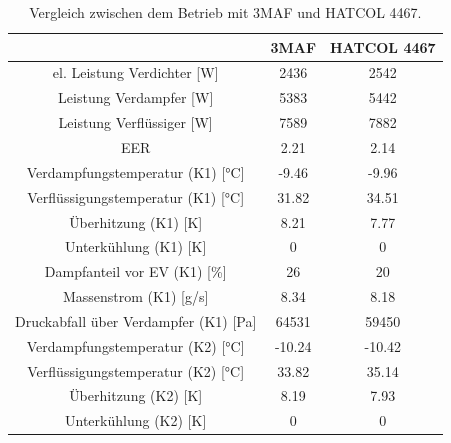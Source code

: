 \begin{table}[h!]
\centering
\caption{Vergleich zwischen dem Betrieb mit 3MAF und HATCOL 4467.}
\label{tab:VergleichKMOele}
\begin{tabular}{|ccc|}
\hline

                                                                & 3MAF                        & HATCOL 4467 \\ \hline
\multicolumn{1}{|c|}{el. Leistung Verdichter {[}W{]}}           & \multicolumn{1}{c|}{2436}   & 2542        \\
\multicolumn{1}{|c|}{Leistung Verdampfer {[}W{]}}               & \multicolumn{1}{c|}{5383}   & 5442        \\
\multicolumn{1}{|c|}{Leistung Verflüssiger {[}W{]}}             & \multicolumn{1}{c|}{7589}   & 7882        \\
\multicolumn{1}{|c|}{EER}                                       & \multicolumn{1}{c|}{2.21}   & 2.14        \\ \hline
\multicolumn{1}{|c|}{Verdampfungstemperatur (K1) {[}°C{]}}      & \multicolumn{1}{c|}{-9.46}  & -9.96       \\
\multicolumn{1}{|c|}{Verflüssigungstemperatur (K1) {[}°C{]}}    & \multicolumn{1}{c|}{31.82}  & 34.51       \\
\multicolumn{1}{|c|}{Überhitzung (K1) {[}K{]}}                  & \multicolumn{1}{c|}{8.21}   & 7.77        \\
\multicolumn{1}{|c|}{Unterkühlung (K1) {[}K{]}}                 & \multicolumn{1}{c|}{0}      & 0           \\
\multicolumn{1}{|c|}{Dampfanteil vor EV (K1) {[}\%{]}}          & \multicolumn{1}{c|}{26}     & 20          \\
\multicolumn{1}{|c|}{Massenstrom (K1) {[}g/s{]}}                & \multicolumn{1}{c|}{8.34}   & 8.18        \\
\multicolumn{1}{|c|}{Druckabfall über Verdampfer (K1) {[}Pa{]}} & \multicolumn{1}{c|}{64531}  & 59450       \\ \hline
\multicolumn{1}{|c|}{Verdampfungstemperatur (K2) {[}°C{]}}      & \multicolumn{1}{c|}{-10.24} & -10.42      \\
\multicolumn{1}{|c|}{Verflüssigungstemperatur (K2) {[}°C{]}}    & \multicolumn{1}{c|}{33.82}  & 35.14       \\
\multicolumn{1}{|c|}{Überhitzung (K2) {[}K{]}}                  & \multicolumn{1}{c|}{8.19}   & 7.93        \\
\multicolumn{1}{|c|}{Unterkühlung (K2) {[}K{]}}                 & \multicolumn{1}{c|}{0}      & 0           \\

\end{tabular}
\end{table}
